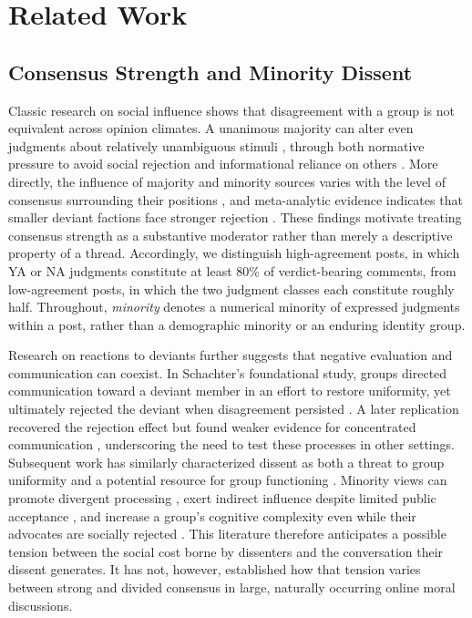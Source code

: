 \section{Related Work}
\label{sec:related-work}

\subsection{Consensus Strength and Minority Dissent}

Classic research on social influence shows that disagreement with a group is not equivalent across opinion climates. A unanimous majority can alter even judgments about relatively unambiguous stimuli \cite{asch1956independence}, through both normative pressure to avoid social rejection and informational reliance on others \cite{deutsch1955normative}. More directly, the influence of majority and minority sources varies with the level of consensus surrounding their positions \cite{martin2002consensus}, and meta-analytic evidence indicates that smaller deviant factions face stronger rejection \cite{tata1996proportionate}. These findings motivate treating consensus strength as a substantive moderator rather than merely a descriptive property of a thread. Accordingly, we distinguish high-agreement posts, in which YA or NA judgments constitute at least 80\% of verdict-bearing comments, from low-agreement posts, in which the two judgment classes each constitute roughly half. Throughout, \emph{minority} denotes a numerical minority of expressed judgments within a post, rather than a demographic minority or an enduring identity group.

Research on reactions to deviants further suggests that negative evaluation and communication can coexist. In Schachter's foundational study, groups directed communication toward a deviant member in an effort to restore uniformity, yet ultimately rejected the deviant when disagreement persisted \cite{schachter1951deviation}. A later replication recovered the rejection effect but found weaker evidence for concentrated communication \cite{wesselmann2014revisiting}, underscoring the need to test these processes in other settings. Subsequent work has similarly characterized dissent as both a threat to group uniformity and a potential resource for group functioning \cite{jetten2014deviance}. Minority views can promote divergent processing \cite{nemeth1986differential}, exert indirect influence despite limited public acceptance \cite{wood1994minority}, and increase a group's cognitive complexity even while their advocates are socially rejected \cite{curseu2012socially}. This literature therefore anticipates a possible tension between the social cost borne by dissenters and the conversation their dissent generates. It has not, however, established how that tension varies between strong and divided consensus in large, naturally occurring online moral discussions.

